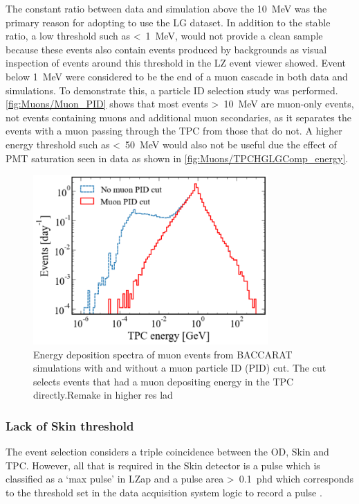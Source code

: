 The constant ratio between data and simulation above the 10~MeV was the primary reason for adopting to use the LG dataset. In addition to the stable ratio, a low threshold such as \textless~1~MeV, would not provide a clean sample because these events also contain events produced by backgrounds as visual inspection of events around this threshold in the LZ event viewer showed. Event below 1~MeV were considered to be the end of a muon cascade in both data and simulations. To demonstrate this, a particle ID selection study was performed. \autoref{fig:Muons/Muon_PID} shows that most events \textgreater~10~MeV are muon-only events, not events containing muons and additional muon secondaries, as it separates the events with a muon passing through the TPC from those that do not. A higher energy threshold such as \textless~50~MeV would also not be useful due the effect of PMT saturation seen in data as shown in \autoref{fig:Muons/TPCHGLGComp_energy}.
\begin{figure}[ht!]
    \centering
    \includegraphics[width=0.8\textwidth]{figures/Muons/Muon_pid_cutLZstyle.pdf}
    \caption{Energy deposition spectra of muon events from BACCARAT simulations with and without a muon particle ID (PID) cut. The cut selects events that had a muon depositing energy in the TPC directly.{\color{red}Remake in higher res lad}}
    \label{fig:Muons/Muon_PID}
\end{figure}

\subsubsection{Lack of Skin threshold}\label{sec:Muons/MuonFluxSkinThreshold}
The event selection considers a triple coincidence between the OD, Skin and TPC. However, all that is required in the Skin detector is a pulse which is classified as a `max pulse' in LZap and a pulse area \textgreater~0.1~phd which corresponds to the threshold set in the data acquisition system logic to record a pulse \cite{LZ:2024bvw}.

